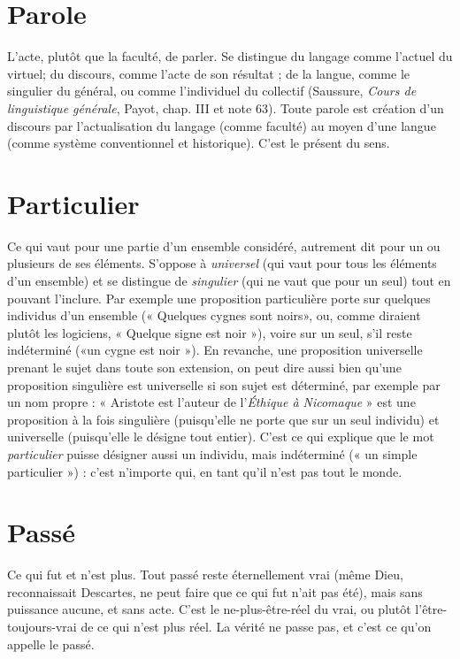 \section{Parole}
L'acte, plutôt que la faculté, de parler. Se distingue du langage
comme l'actuel du virtuel; du discours, comme l’acte de son
résultat ; de la langue, comme le singulier du général, ou comme l’individuel
du collectif (Saussure, {\it Cours de linguistique générale}, Payot, chap. III et note 63).
Toute parole est création d’un discours par l’actualisation du langage (comme
faculté) au moyen d’une langue (comme système conventionnel et historique).
C’est le présent du sens.

\section{Particulier}
Ce qui vaut pour une partie d’un ensemble considéré, autrement
dit pour un ou plusieurs de ses éléments. S’oppose à
{\it universel} (qui vaut pour tous les éléments d’un ensemble) et se distingue de {\it singulier}
(qui ne vaut que pour un seul) tout en pouvant l’inclure. Par exemple
une proposition particulière porte sur quelques individus d’un ensemble
(« Quelques cygnes sont noirs», ou, comme diraient plutôt les logiciens,
« Quelque signe est noir »), voire sur un seul, s’il reste indéterminé («un cygne
est noir »). En revanche, une proposition universelle prenant le sujet dans toute
son extension, on peut dire aussi bien qu’une proposition singulière est universelle
si son sujet est déterminé, par exemple par un nom propre : « Aristote est
l’auteur de l'{\it Éthique à Nicomaque} » est une proposition à la fois singulière
(puisqu'elle ne porte que sur un seul individu) et universelle (puisqu’elle le
désigne tout entier). C’est ce qui explique que le mot {\it particulier} puisse désigner
aussi un individu, mais indéterminé (« un simple particulier ») : c’est n'importe
qui, en tant qu'il n’est pas tout le monde.

\section{Passé}
Ce qui fut et n’est plus. Tout passé reste éternellement vrai (même
Dieu, reconnaissait Descartes, ne peut faire que ce qui fut n’ait pas
été), mais sans puissance aucune, et sans acte. C’est le ne-plus-être-réel du vrai,
ou plutôt l’être-toujours-vrai de ce qui n’est plus réel. La vérité ne passe pas, et
c'est ce qu'on appelle le passé.

